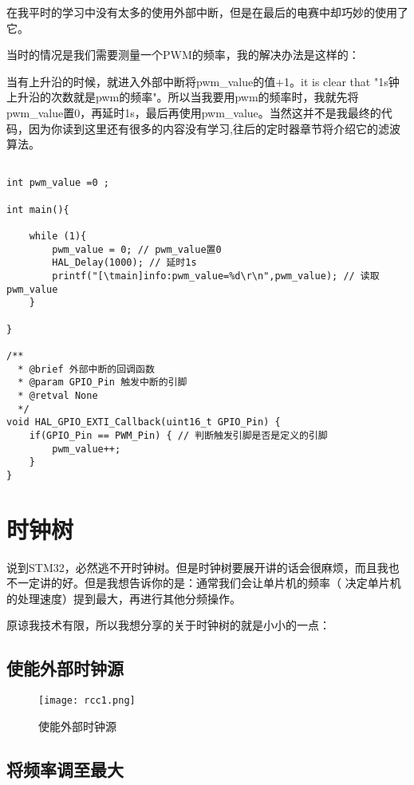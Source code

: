 \documentclass[cn,11pt]{elegantbook}
\begin{document}
在我平时的学习中没有太多的使用外部中断，但是在最后的电赛中却巧妙的使用了它。

当时的情况是我们需要测量一个PWM的频率，我的解决办法是这样的：

当有上升沿的时候，就进入外部中断将pwm\_value的值+1。it is clear that "1s钟上升沿的次数就是pwm的频率"。所以当我要用pwm的频率时，我就先将pwm\_value置0，再延时1s，最后再使用pwm\_value。当然这并不是我最终的代码，因为你读到这里还有很多的内容没有学习,往后的定时器章节将介绍它的滤波算法。

\lstset{  language=C}
\begin{lstlisting}

int pwm_value =0 ;

int main(){

	while (1){
		pwm_value = 0; // pwm_value置0
		HAL_Delay(1000); // 延时1s
		printf("[\tmain]info:pwm_value=%d\r\n",pwm_value); // 读取pwm_value
	}

}

/**
  * @brief 外部中断的回调函数
  * @param GPIO_Pin 触发中断的引脚
  * @retval None
  */
void HAL_GPIO_EXTI_Callback(uint16_t GPIO_Pin) {
	if(GPIO_Pin == PWM_Pin) { // 判断触发引脚是否是定义的引脚
		pwm_value++; 
	}
}

\end{lstlisting}

\newpage


\section{时钟树}
说到STM32，必然逃不开时钟树。但是时钟树要展开讲的话会很麻烦，而且我也不一定讲的好。但是我想告诉你的是：通常我们会让单片机的频率（ 决定单片机的处理速度）提到最大，再进行其他分频操作。

原谅我技术有限，所以我想分享的关于时钟树的就是小小的一点：

\subsection{使能外部时钟源}

\begin{figure}[htbp]
	\centering
	\texttt{[image: rcc1.png]}
	\caption{使能外部时钟源 \label{fig:scatter}}
\end{figure}

\subsection{将频率调至最大}
\end{document}
